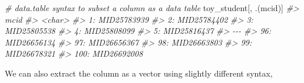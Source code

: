 \documentclass[
]{book}
\newenvironment{Shaded}{\begin{snugshade}}{\end{snugshade}}
\newcommand{\CommentTok}[1]{\textcolor[rgb]{0.56,0.35,0.01}{\textit{#1}}}
\newcommand{\NormalTok}[1]{#1}
\begin{document}
\begin{Shaded}
\begin{Highlighting}[]
\CommentTok{\# data.table syntax to subset a column as a data table}
\NormalTok{toy\_student[, .(mcid)]}
\CommentTok{\#\textgreater{}             mcid}
\CommentTok{\#\textgreater{}           \textless{}char\textgreater{}}
\CommentTok{\#\textgreater{}   1: MID25783939}
\CommentTok{\#\textgreater{}   2: MID25784402}
\CommentTok{\#\textgreater{}   3: MID25805538}
\CommentTok{\#\textgreater{}   4: MID25808099}
\CommentTok{\#\textgreater{}   5: MID25816437}
\CommentTok{\#\textgreater{}  {-}{-}{-}            }
\CommentTok{\#\textgreater{}  96: MID26656134}
\CommentTok{\#\textgreater{}  97: MID26656367}
\CommentTok{\#\textgreater{}  98: MID26663803}
\CommentTok{\#\textgreater{}  99: MID26678321}
\CommentTok{\#\textgreater{} 100: MID26692008}
\end{Highlighting}
\end{Shaded}

We can also extract the column as a vector using slightly different syntax,
\end{document}
